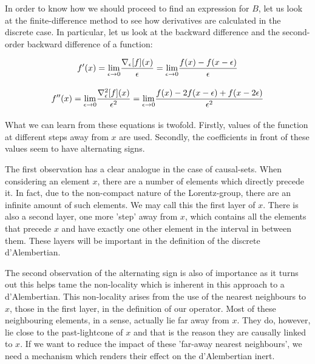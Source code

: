 \documentclass[a4paper,12pt]{article}
\numberwithin{equation}{section}
\begin{document}
In order to know how we should proceed to find an expression for $B$, let us look at the finite-difference method to see how derivatives are calculated in the discrete case. In particular, let us look at the backward difference and the second-order backward difference of a function:

\begin{subequations}
\label{eq:Finite difference}
\begin{gather}
f'(x)=\underset{\epsilon \rightarrow 0}{\text{lim}} \frac{\nabla_\epsilon[f](x)}{\epsilon}=\underset{\epsilon \rightarrow 0}{\text{lim}} \frac{f(x)-f(x-\epsilon)}{\epsilon}\\[1em]
f''(x)=\underset{\epsilon \rightarrow 0}{\text{lim}} \frac{\nabla^2_\epsilon[f](x)}{\epsilon^2}=\underset{\epsilon \rightarrow 0}{\text{lim}} \frac{f(x)-2 f(x-\epsilon)+f(x-2\epsilon)}{\epsilon^2}
\vspace{1mm}
\end{gather}
\end{subequations}

What we can learn from these equations is twofold. Firstly, values of the function at different steps away from $x$ are used. Secondly, the coefficients in front of these values seem to have alternating signs.

The first observation has a clear analogue in the case of causal-sets. When considering an element $x$, there are a number of elements which directly precede it. In fact, due to the non-compact nature of the Lorentz-group, there are an infinite amount of such elements. We may call this the first layer of $x$. There is also a second layer, one more 'step' away from $x$, which contains all the elements that precede $x$ and have exactly one other element in the interval in between them. These layers will be important in the definition of the discrete d'Alembertian.

The second observation of the alternating sign is also of importance as it turns out this helps tame the non-locality which is inherent in this approach to a d'Alembertian. This non-locality arises from the use of the nearest neighbours to $x$, those in the first layer, in the definition of our operator. Most of these neighbouring elements, in a sense, actually lie far away from $x$. They do, however, lie close to the past-lightcone of $x$ and that is the reason they are causally linked to $x$. If we want to reduce the impact of these 'far-away nearest neighbours', we need a mechanism which renders their effect on the d'Alembertian inert.
\end{document}
